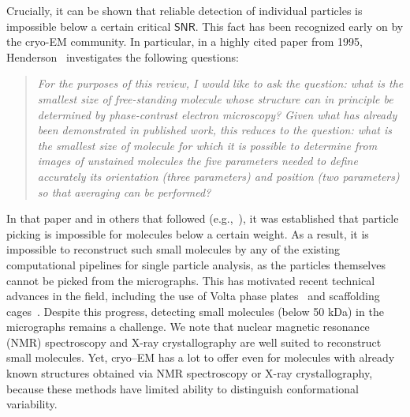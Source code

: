 \documentclass[english,11pt]{article}
\newcommand{\1}{\mathbf{1}}
\newcommand{\TODO}[1]{{\color{red}{[#1]}}}
\numberwithin{equation}{section}
\theoremstyle{plain}
\theoremstyle{definition}
\theoremstyle{remark}
\theoremstyle{plain}
\theoremstyle{remark}
\theoremstyle{plain}
\theoremstyle{plain}
\newcommand{\SNR}{\ensuremath{\textsf{SNR}}}
\begin{document}
Crucially, it can be shown that reliable detection of individual particles is impossible below a certain critical $\SNR$. This fact has been recognized early on by the cryo-EM community. In particular, in a highly cited paper from 1995, Henderson~\cite{henderson1995limitations} investigates the following questions:
\begin{quote}
	\emph{For the purposes of this review, I would like to ask the question: what is the smallest size of free-standing molecule whose structure can in principle be determined by phase-contrast electron microscopy? Given what has already been demonstrated in published work, this reduces to the question: what is the smallest size of molecule for which it is possible to determine from images of unstained molecules the five parameters needed to define accurately its orientation (three parameters) and position (two parameters) so that averaging can be performed?}
\end{quote}
In that paper and in others that followed (e.g.,~\cite{glaeser1999electron}), it was established that particle picking is impossible for molecules below a certain weight.
As a result, it is impossible to reconstruct such small molecules by any of the existing computational pipelines for single particle analysis, as the particles themselves cannot be picked from the micrographs.
%
This has motivated recent technical advances in the field, including the use of Volta phase plates~\cite{khoshouei2017cryo,liang2017phase} and scaffolding cages~\cite{liu2018nearatomic}.
%
%
Despite this progress, detecting small molecules (below 50 kDa) in the micrographs remains a challenge.
We note that nuclear magnetic resonance (NMR) spectroscopy and X-ray crystallography are well suited to reconstruct small molecules. Yet, cryo--EM has a lot to offer even for molecules with already known structures obtained via NMR spectroscopy or X-ray crystallography, because these methods have limited ability to distinguish conformational variability. \TODO{Need a ref for this claim.}
\end{document}
